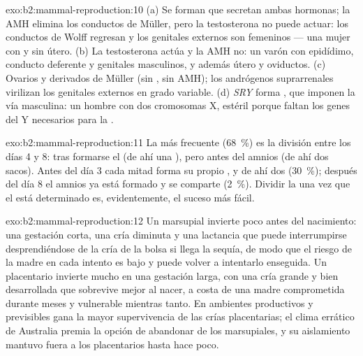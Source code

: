 \begin{solution}{exo:b2:mammal-reproduction:10}
(a) Se forman  que secretan ambas hormonas; la AMH elimina los
conductos de Müller, pero la testosterona no puede actuar: los conductos
de Wolff regresan y los genitales externos son femeninos --- una mujer
con  y sin útero. (b) La testosterona actúa y la AMH no: un
varón con epidídimo, conducto deferente y genitales masculinos, y además
útero y oviductos. (c) Ovarios y derivados de Müller (sin , sin
AMH); los andrógenos suprarrenales virilizan los genitales externos en
grado variable. (d)
\emph{SRY} forma , que imponen la vía masculina: un hombre con
dos cromosomas X, estéril porque faltan los genes del Y necesarios para
la .
\end{solution}

\begin{solution}{exo:b2:mammal-reproduction:11}
La más frecuente (\qty{68}{\%}) es la división entre los días 4 y 8: tras
formarse el  (de ahí una ), pero antes del amnios (de
ahí dos sacos). Antes del día 3 cada mitad forma su propio , y
de ahí dos  (\qty{30}{\%}); después del día 8 el amnios ya está
formado y se comparte (\qty{2}{\%}). Dividir la  una
vez que el  está determinado es, evidentemente, el suceso más
fácil.
\end{solution}

\begin{solution}{exo:b2:mammal-reproduction:12}
Un marsupial invierte poco antes del nacimiento: una gestación corta, una
cría diminuta y una lactancia que puede interrumpirse desprendiéndose de
la cría de la bolsa si llega la sequía, de modo que el riesgo de la madre
en cada intento es bajo y puede volver a intentarlo enseguida. Un
placentario invierte mucho en una gestación larga, con una cría grande y
bien desarrollada que sobrevive mejor al nacer, a costa de una madre
comprometida durante meses y vulnerable mientras tanto. En ambientes
productivos y previsibles gana la mayor supervivencia de las crías
placentarias; el clima errático de Australia premia la opción de
abandonar de los marsupiales, y su aislamiento mantuvo fuera a los
placentarios hasta hace poco.
\end{solution}

